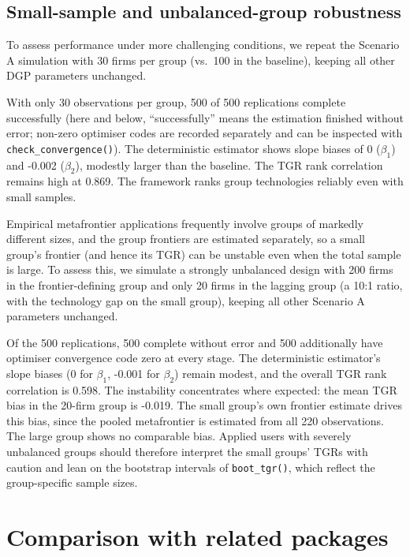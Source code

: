 \subsection{Small-sample and unbalanced-group robustness}\label{sec:robustness}

To assess performance under more challenging conditions, we repeat the
Scenario A simulation with 30 firms per group (vs.~100 in the baseline),
keeping all other DGP parameters unchanged.

With only 30 observations per group, 500 of 500 replications
complete successfully (here and below, ``successfully'' means the estimation
finished without error; non-zero optimiser codes are recorded separately
and can be inspected with \texttt{check\_convergence()}). The deterministic
estimator shows slope biases of
0 (\(\beta_1\)) and
-0.002 (\(\beta_2\)), modestly larger than the
baseline. The TGR rank correlation remains high at
0.869. The framework ranks group technologies
reliably even with small samples.

Empirical metafrontier applications frequently involve groups of markedly
different sizes, and the group frontiers are estimated separately, so a
small group's frontier (and hence its TGR) can be unstable even when the
total sample is large. To assess this, we simulate a strongly unbalanced
design with 200 firms in the frontier-defining group and only 20 firms in
the lagging group (a 10:1 ratio, with the technology gap on the small
group), keeping all other Scenario A parameters unchanged.

Of the 500 replications, 500 complete without error and
500 additionally have optimiser convergence code zero at every
stage. The deterministic estimator's slope biases
(0 for \(\beta_1\), -0.001 for
\(\beta_2\)) remain modest, and the overall TGR rank correlation is
0.598. The instability concentrates where expected: the
mean TGR bias in the 20-firm group is -0.019.
The small group's own frontier estimate drives this bias, since the pooled
metafrontier is estimated from all 220 observations. The large group shows no comparable bias.
Applied users with severely unbalanced groups should therefore interpret
the small groups' TGRs with caution and lean on the bootstrap intervals of
\texttt{boot\_tgr()}, which reflect the group-specific sample sizes.

\section{Comparison with related packages}\label{sec:comparison}

